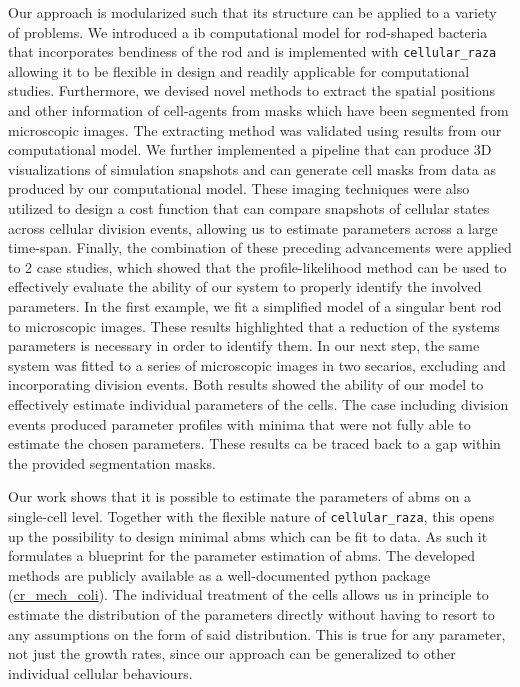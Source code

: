 \documentclass{article}
\begin{document}
Our approach is modularized such that its structure can be applied to a variety of problems.
We introduced a \ac{ib} computational model for rod-shaped bacteria that incorporates bendiness of
the rod and is implemented with \texttt{cellular\_raza} allowing it to be flexible in design and
readily applicable for computational studies.
Furthermore, we devised novel methods to extract the spatial positions and other information of
cell-agents from masks which have been segmented from microscopic images.
The extracting method was validated using results from our computational model.
We further implemented a pipeline that can produce 3D visualizations of simulation snapshots and can
generate cell masks from data as produced by our computational model.
These imaging techniques were also utilized to design a cost function that can compare snapshots
of cellular states across cellular division events, allowing us to estimate parameters across a
large time-span.
Finally, the combination of these preceding advancements were applied to 2 case studies, which showed
that the profile-likelihood method can be used to effectively evaluate the ability of our system to
properly identify the involved parameters.
In the first example, we fit a simplified model of a singular bent rod to microscopic images.
These results highlighted that a reduction of the systems parameters is necessary in order to
identify them.
In our next step, the same system was fitted to a series of microscopic images in two secarios,
excluding and incorporating division events.
Both results showed the ability of our model to effectively estimate individual parameters of the
cells.
The case including division events produced parameter profiles with minima that were not fully able
to estimate the chosen parameters.
These results ca be traced back to a gap within the provided segmentation masks.

Our work shows that it is possible to estimate the parameters of \acp{abm} on a single-cell level.
Together with the flexible nature of \texttt{cellular\_raza}, this opens up the possibility to
design minimal \acp{abm} which can be fit to data.
As such it formulates a blueprint for the parameter estimation of \acp{abm}.
The developed methods are publicly available as a well-documented python package
(\href{https://github.com/jonaspleyer/cr_mech_coli}{cr\_mech\_coli}).
The individual treatment of the cells allows us in principle to estimate the distribution of the
parameters directly without having to resort to any assumptions on the form of said distribution.
This is true for any parameter, not just the growth rates, since our approach can be generalized to
other individual cellular behaviours.
\end{document}
